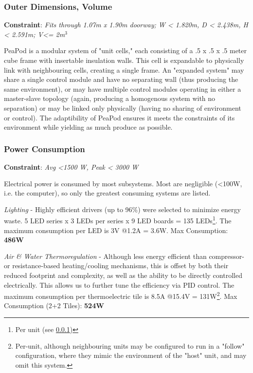 \documentclass{report}
\begin{document}
\subsubsection{Outer Dimensions, Volume}
\label{sec:constraints-volume}

\textbf{Constraint}: \textit{Fits through 1.07m x 1.90m doorway; W < 1.820m, D < 2.438m, H < 2.591m; V<= 2m${}^3$}


PeaPod is a modular system of "unit cells," each consisting of a .5 x .5 x .5 meter cube frame with insertable insulation walls. This cell is expandable to physically link with neighbouring cells, creating a single frame. An "expanded system" may share a single control module and have no separating wall (thus producing the same environment), or may have multiple control modules operating in either a master-slave topology (again, producing a homogenous system with no separation) or may be linked only physically (having no sharing of environment or control). The adaptibility of PeaPod ensures it meets the constraints of its environment while yielding as much produce as possible.

\subsubsection{Power Consumption} 
\label{sec:constraints-power}

\textbf{Constraint}: \textit{Avg <1500 W, Peak < 3000 W}

Electrical power is consumed by most subsystems. Most are negligible (<100W, i.e. the computer), so only the greatest consuming systems are listed.

\textit{Lighting} - Highly efficient drivers (up to 96\%) were selected to minimize energy waste. 5 LED series x 3 LEDs per series x 9 LED boards = 135 LEDs\footnote{Per unit (see \ref{sec:constraints-volume})}. The maximum consumption per LED is 3V @1.2A = 3.6W. Max Consumption: \textbf{486W}\footnotemark[1]

\textit{Air \& Water Thermoregulation} - Although less energy efficient than compressor- or resistance-based heating/cooling mechanisms, this is offset by both their reduced footprint and complexity, as well as the ability to be directly controlled electrically. This allows us to further tune the efficiency via PID control. The maximum consumption per thermoelectric tile is 8.5A @15.4V = 131W\footnote{Per-unit, although neighbouring units may be configured to run in a "follow" configuration, where they mimic the environment of the "host" unit, and may omit this system.}. Max Consumption (2+2 Tiles\footnotemark[1]): \textbf{524W}
\end{document}
